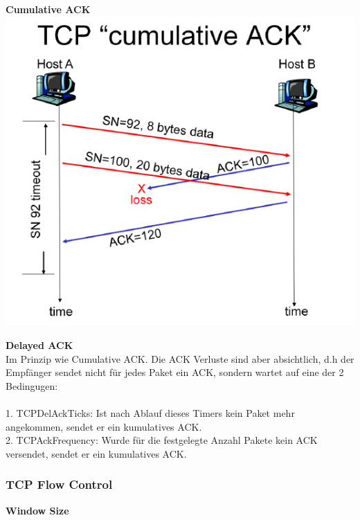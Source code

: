 \begin{minipage}[t]{0.5\linewidth}
	\textbf{Cumulative ACK}\\
	\includegraphics[width=\linewidth]{media/cumulativeACK.png}\\
\end{minipage}
\begin{minipage}[t]{0.5\linewidth}
	\textbf{Delayed ACK}\\
	Im Prinzip wie Cumulative ACK. Die ACK Verluste sind aber absichtlich, d.h der Empfänger sendet nicht für jedes Paket ein ACK, sondern wartet auf eine der 2 Bedingugen:\\\\
	1. TCPDelAckTicks: Ist nach Ablauf dieses Timers kein Paket mehr angekommen, sendet er ein kumulatives ACK. \\
	2. TCPAckFrequency: Wurde für die festgelegte Anzahl Pakete kein ACK versendet, sendet er ein kumulatives ACK.\\
\end{minipage}

\subsubsection{TCP Flow Control}

\textbf{Window Size}\\

